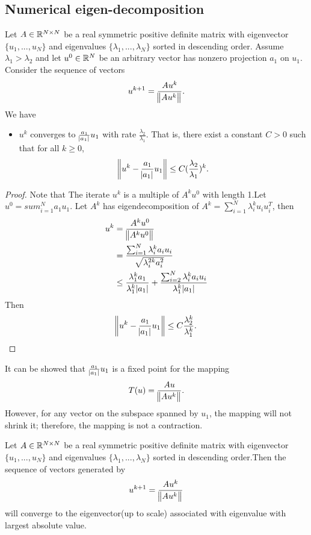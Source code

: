 \begin{refsection}
\subsection{Numerical eigen-decomposition}
\begin{theorem}\cite[115]{ma2002generalized}\cite[451]{golub2013matrix}
Let $A\in \mathbb{R}^{N\times N}$ be a real symmetric positive definite matrix with eigenvector $\{u_1,...,u_N\}$ and eigenvalues $\{\lambda_1,...,\lambda_N\}$ sorted in descending order. Assume $\lambda_1 > \lambda_2$ and let $u^0\in \mathbb{R}^N$ be an arbitrary vector has nonzero projection $a_1$ on $u_1$. Consider the sequence of vectors
$$u^{k+1} = \frac{Au^k}{\norm{Au^k}}.$$
We have 
\begin{itemize}
	\item $u^k$ converges to $\frac{a_1}{\abs{a_1}}u_1$ with rate $\frac{\lambda_2}{\lambda_1}$. That is, there exist a constant $C > 0$ such that for all 
	$k\geq 0$, 
	$$\norm{u^k - \frac{a_1}{\abs{a_1}}u_1} \leq C(\frac{\lambda_2}{\lambda_1})^k.$$
\end{itemize}	
\end{theorem}
\begin{proof}
Note that The iterate $u^k$ is a multiple of $A^k u^0$ with length 1.Let $u^0 = sum_{i=1}^N a_1 u_1$. Let $A^k$ has eigendecomposition of $A^k = \sum_{i=1}^N \lambda_i^ku_iu_i^T$, then
\begin{align*}
u^k &= \frac{A^k u^0}{\norm{A^k u^0}} \\
&= \frac{\sum_{i=1}^N \lambda^k_i a_i u_i}{\sqrt{\lambda^{2k}_i a_i^2}}\\
&\leq \frac{ \lambda^k_1 a_1 }{\lambda^k_1 \abs{a_1}}+\frac{\sum_{i=2}^N \lambda^k_i a_i u_i}{\lambda^k_1 \abs{a_1}}
\end{align*}
Then $$\norm{u^k - \frac{a_1}{\abs{a_1}} u_1} \leq C\frac{\lambda_2^k}{\lambda_1^k}.$$
\end{proof}


\begin{remark}
	It can be showed that $\frac{a_1}{\abs{a_1}}u_1$ is a fixed point for the mapping $$T(u) = \frac{Au}{\norm{Au^k}}.$$
	However, for any vector on the subspace spanned by $u_1$, the mapping will not shrink it; therefore, the mapping is not a contraction. 
\end{remark}

\begin{corollary}
Let $A\in \mathbb{R}^{N\times N}$ be a real symmetric positive definite matrix with eigenvector $\{u_1,...,u_N\}$ and eigenvalues $\{\lambda_1,...,\lambda_N\}$ sorted in descending order.Then  the sequence of vectors generated by
$$u^{k+1} = \frac{Au^k}{\norm{Au^k}}$$
will converge to the eigenvector(up to scale) associated with eigenvalue with largest absolute value. 
\end{corollary}



\end{refsection}
